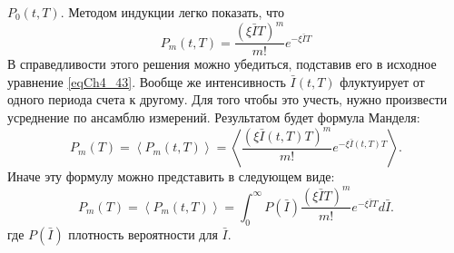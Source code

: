 $P_0\left(t, T\right)$. Методом индукции легко показать, что  
\begin{equation}
P_m\left(t, T\right) = \frac{\left(\xi \bar{I} T\right)^m}{m!} e^{-
  \xi \bar{I} T} 
\label{eqCh4_47}
\end{equation}
В справедливости этого решения можно убедиться, подставив его в
исходное уравнение \eqref{eqCh4_43}. Вообще же интенсивность
$\bar{I}\left(t, T\right)$
флуктуирует от одного периода счета к другому. Для того чтобы
это учесть, нужно произвести усреднение по ансамблю
измерений. Результатом будет формула Манделя: 
\begin{equation}
P_m\left(T\right) = 
\left<P_m\left(t, T\right)\right> = 
\left<
\frac{\left(\xi \bar{I}\left(t, T\right) T\right)^m}{m!} e^{-
  \xi \bar{I}\left(t, T\right) T} 
\right>.
\label{eqCh4_48}
\end{equation}
Иначе эту формулу можно представить в следующем виде:
\begin{equation}
P_m\left(T\right) = 
\left<P_m\left(t, T\right)\right> = 
\int_0^{\infty}
P\left(\bar{I}\right)
\frac{\left(\xi \bar{I}T\right)^m}{m!} e^{-
  \xi \bar{I} T} 
d \bar{I}.
\label{eqCh4_49}
\end{equation}
где $P\left(\bar{I}\right)$ плотность вероятности для $\bar{I}$. 
